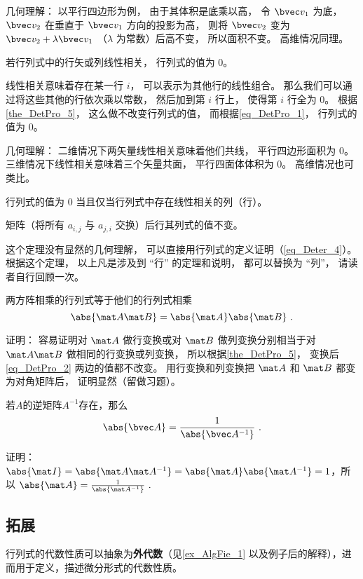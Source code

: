 几何理解： 以平行四边形为例， 由于其体积是底乘以高， 令 $\bvec v_1$ 为底， $\bvec v_2$ 在垂直于 $\bvec v_1$ 方向的投影为高， 则将 $\bvec v_2$ 变为 $\bvec v_2 + \lambda \bvec v_1$ （$\lambda$ 为常数）后高不变， 所以面积不变。 高维情况同理。

\begin{theorem}{ }\label{the_DetPro_9}
若行列式中的行矢或列线性相关， 行列式的值为 0。
\end{theorem}
线性相关意味着存在某一行 $i$， 可以表示为其他行的线性组合。 那么我们可以通过将这些其他的行依次乘以常数， 然后加到第 $i$ 行上， 使得第 $i$ 行全为 0。 根据\autoref{the_DetPro_5}， 这么做不改变行列式的值， 而根据\autoref{eq_DetPro_1}， 行列式的值为 0。

几何理解： 二维情况下两矢量线性相关意味着他们共线， 平行四边形面积为 0。 三维情况下线性相关意味着三个矢量共面， 平行四面体体积为 0。 高维情况也可类比。

\begin{theorem}{ } \label{the_DetPro_2}
行列式的值为 0 当且仅当行列式中存在线性相关的列（行）。
\end{theorem}

\begin{theorem}{ }\label{the_DetPro_7}
矩阵（将所有 $a_{i,j}$ 与 $a_{j,i}$ 交换）后行其列式的值不变。
\end{theorem}
这个定理没有显然的几何理解， 可以直接用行列式的定义证明（\autoref{eq_Deter_4}）。 根据这个定理， 以上凡是涉及到 “行” 的定理和说明， 都可以替换为 “列”， 请读者自行回顾一次。

\begin{theorem}{}\label{the_DetPro_8}
两方阵相乘的行列式等于他们的行列式相乘
\begin{equation}\label{eq_DetPro_2}
\abs{\mat A \mat B} = \abs{\mat A}\abs{\mat B}~.
\end{equation}
\end{theorem}
证明： 容易证明对 $\mat A$ 做行变换或对 $\mat B$ 做列变换分别相当于对 $\mat A\mat B$ 做相同的行变换或列变换， 所以根据\autoref{the_DetPro_5}， 变换后\autoref{eq_DetPro_2} 两边的值都不改变。 用行变换和列变换把 $\mat A$ 和 $\mat B$ 都变为对角矩阵后， 证明显然（留做习题）。

\begin{theorem}{}
若$A$的逆矩阵$A^{-1}$存在，那么
\begin{equation}
\abs{\bvec A}=\frac{1}{\abs{\bvec A^{-1}}}~.
\end{equation}
\end{theorem}
证明：
$\abs{\mat I} = \abs{\mat A \mat A^{-1}} = \abs{\mat A}\abs{\mat A^{-1}}=1$，所以
$\abs{\mat A}=\frac{1}{\abs{\mat A^{-1}}}~.$

\subsection{拓展}

行列式的代数性质可以抽象为\textbf{外代数}（见\autoref{ex_AlgFie_1}  以及例子后的解释），进而用于定义，描述微分形式的代数性质。
